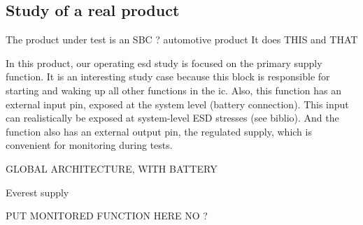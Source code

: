 \subsection{Study of a real product}
\label{sec:real-product-study}

The product under test is an SBC ?
automotive product
It does THIS and THAT

In this product, our operating \gls{esd} study is focused on the primary supply function.
It is an interesting study case because this block is responsible for starting and waking up all other functions in the \gls{ic}.
Also, this function has an external input pin, exposed at the system level (battery connection).
This input can realistically be exposed at system-level ESD stresses (see biblio).
And the function also has an external output pin, the regulated supply, which is convenient for monitoring during tests.

GLOBAL ARCHITECTURE, WITH BATTERY

Everest supply

PUT MONITORED FUNCTION HERE NO ?
